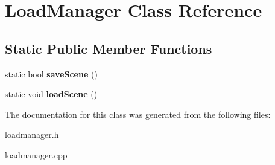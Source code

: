 \hypertarget{classLoadManager}{}\section{Load\+Manager Class Reference}
\label{classLoadManager}
\subsection*{Static Public Member Functions}
\begin{DoxyCompactItemize}
\item 
\mbox{\label{classLoadManager_a3f96fe7100a7b76fd63e8500b89bd84c}} 
static bool {\bfseries save\+Scene} ()
\item 
\mbox{\label{classLoadManager_a2836efb2f4a790d0c86d10de9ff9a1f2}} 
static void {\bfseries load\+Scene} ()
\end{DoxyCompactItemize}


The documentation for this class was generated from the following files\+:\begin{DoxyCompactItemize}
\item 
loadmanager.\+h\item 
loadmanager.\+cpp\end{DoxyCompactItemize}
